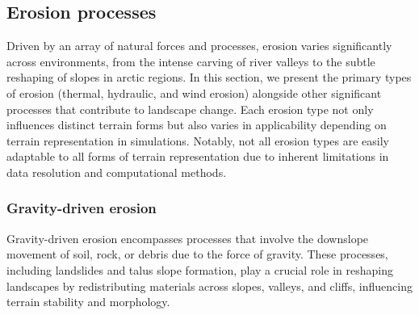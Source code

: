 
\subsection{Erosion processes}
Driven by an array of natural forces and processes, erosion varies significantly across environments, from the intense carving of river valleys to the subtle reshaping of slopes in arctic regions. In this section, we present the primary types of erosion (thermal, hydraulic, and wind erosion) alongside other significant processes that contribute to landscape change.  
Each erosion type not only influences distinct terrain forms but also varies in applicability depending on terrain representation in simulations. Notably, not all erosion types are easily adaptable to all forms of terrain representation due to inherent limitations in data resolution and computational methods.

\subsubsection{Gravity-driven erosion}
Gravity-driven erosion encompasses processes that involve the downslope movement of soil, rock, or debris due to the force of gravity. These processes, including landslides and talus slope formation, play a crucial role in reshaping landscapes by redistributing materials across slopes, valleys, and cliffs, influencing terrain stability and morphology.



